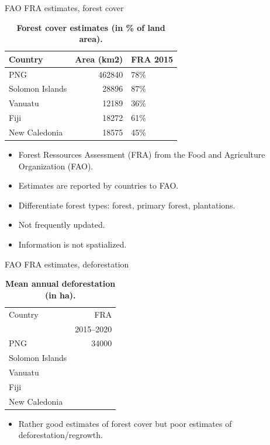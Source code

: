 \documentclass[10pt,table,dvipsnames,compress]{beamer}
\begin{document}
\begin{frame}[label={sec:org306eb15}]{FAO FRA estimates, forest cover}
\begin{table}[htbp]
\caption{\textbf{Forest cover estimates (in \% of land area).}}
\centering
\footnotesize
\begin{tabular}{lrl}
Country & Area (km2) & FRA 2015\\[0pt]
\hline
PNG & 462840 & 78\%\\[0pt]
Solomon Islands & 28896 & 87\%\\[0pt]
Vanuatu & 12189 & 36\%\\[0pt]
Fiji & 18272 & 61\%\\[0pt]
New Caledonia & 18575 & 45\%\\[0pt]
\end{tabular}
\end{table}

\begin{itemize}
\item Forest Ressources Assessment (FRA) from the Food and Agriculture Organization (FAO).
\item Estimates are reported by countries to FAO.
\item Differentiate forest types: forest, primary forest, plantations.
\item Not frequently updated.
\item Information is not spatialized.
\end{itemize}
\end{frame}

\begin{frame}[label={sec:orged9ac7a}]{FAO FRA estimates, deforestation}
\begin{table}[htbp]
\caption{\textbf{Mean annual deforestation (in ha).}}
\centering
\footnotesize
\begin{tabular}{lr}
Country & FRA\\[0pt]
 & 2015--2020\\[0pt]
\hline
PNG & 34000\\[0pt]
Solomon Islands & \\[0pt]
Vanuatu & \\[0pt]
Fiji & \\[0pt]
New Caledonia & \\[0pt]
\end{tabular}
\end{table}

\begin{itemize}
\item Rather good estimates of forest cover but poor estimates of deforestation/regrowth.
\end{itemize}
\end{frame}
\end{document}
